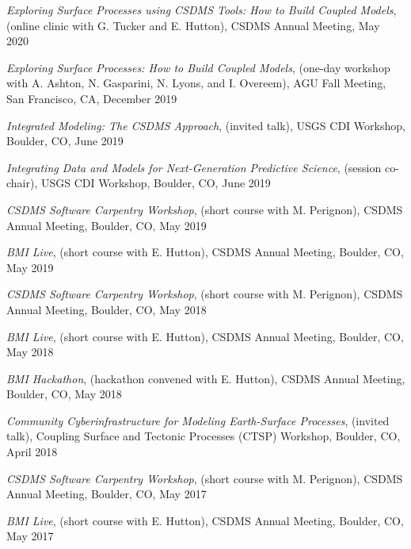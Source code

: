 \begin{enumerate}[{[}1{]}]
  \item \textit{Exploring Surface Processes using CSDMS Tools: How to
    Build Coupled Models}, (online clinic with G. Tucker and
    E. Hutton), CSDMS Annual Meeting, May 2020

  \item \textit{Exploring Surface Processes: How to Build Coupled Models},
    (one-day workshop with A. Ashton, N. Gasparini, N. Lyons, and I. Overeem),
    AGU Fall Meeting, San Francisco, CA, December 2019

  \item \textit{Integrated Modeling: The CSDMS Approach}, (invited
    talk), USGS CDI Workshop, Boulder, CO, June 2019

  \item \textit{Integrating Data and Models for Next-Generation
    Predictive Science}, (session co-chair), USGS CDI Workshop,
    Boulder, CO, June 2019
    
  \item \textit{CSDMS Software Carpentry Workshop}, (short course with
    M. Perignon), CSDMS Annual Meeting, Boulder, CO, May 2019

  \item \textit{BMI Live}, (short course with E. Hutton),
    CSDMS Annual Meeting, Boulder, CO, May 2019

  \item \textit{CSDMS Software Carpentry Workshop}, (short course with
    M. Perignon), CSDMS Annual Meeting, Boulder, CO, May 2018

  \item \textit{BMI Live}, (short course with E. Hutton),
    CSDMS Annual Meeting, Boulder, CO, May 2018

  \item \textit{BMI Hackathon}, (hackathon convened with E. Hutton),
    CSDMS Annual Meeting, Boulder, CO, May 2018

  \item \textit{Community Cyberinfrastructure for Modeling
    Earth-Surface Processes}, (invited talk), Coupling Surface and
    Tectonic Processes (CTSP) Workshop, Boulder, CO, April 2018

  \item \textit{CSDMS Software Carpentry Workshop}, (short course with
    M. Perignon), CSDMS Annual Meeting, Boulder, CO, May 2017

  \item \textit{BMI Live}, (short course with E. Hutton),
    CSDMS Annual Meeting, Boulder, CO, May 2017


\end{enumerate}
